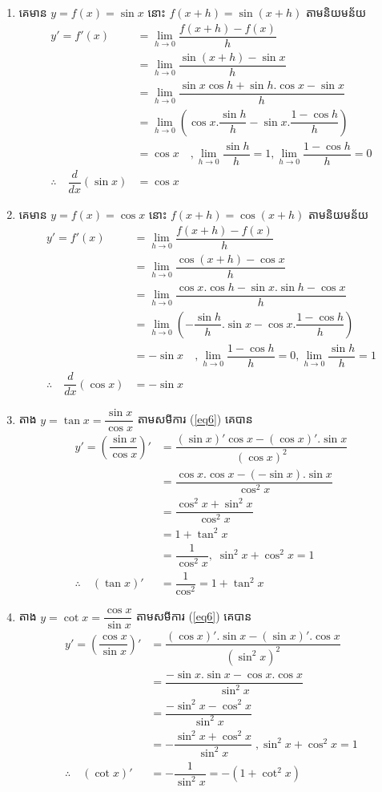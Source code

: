 \documentclass[12pt,fleqn]{book} %
\begin{document}
\begin{enumerate}
\item គេមាន $y=f(x)=\sin x$ នោះ $f(x+h)=\sin (x+h)$ តាមនិយមន័យ 
\begin{align*}
y'=f'(x)&=\lim_{h\to 0}\dfrac{f(x+h)-f(x)}{h}\\
&=\lim_{h\to 0}\dfrac{\sin (x+h)-\sin x}{h}\\
&=\lim_{h\to 0}\dfrac{\sin x\cos h+\sin h.\cos x -\sin x}{h}\\
&=\lim_{h\to 0}\left(\cos x.\dfrac{\sin h}{h}-\sin x.\dfrac{1-\cos h}{h}  \right)\\
&=\cos x \quad , \lim_{h\to 0}\dfrac{\sin h}{h}=1, \lim_{h\to 0}\dfrac{1-\cos h}{h}=0\\
\therefore \quad \dfrac{d}{dx}(\sin x)&=\cos x
\end{align*} 
\item គេមាន $y=f(x)=\cos x$ នោះ $f(x+h)=\cos (x+h)$ តាមនិយមន័យ
\begin{align*}
y'=f'(x)&=\lim_{h\to 0}\dfrac{f(x+h)-f(x)}{h}\\
&=\lim_{h\to 0}\dfrac{\cos (x+h)-\cos x}{h}\\
&=\lim_{h\to 0}\dfrac{\cos x.\cos h-\sin x .\sin h-\cos x}{h}\\
&=\lim_{h\to 0}\left(-\dfrac{\sin h}{h}.\sin x-\cos x. \dfrac{1-\cos h}{h} \right)\\
&=-\sin x \quad , \lim_{h\to 0}\dfrac{1-\cos h}{h}=0,\lim_{h\to 0}\dfrac{\sin h}{h}=1\\
\therefore\quad \dfrac{d}{dx}(\cos x)&=-\sin x
\end{align*}
\item តាង $y=\tan x=\dfrac{\sin x}{\cos x}$ តាមសមីការ (\ref{eq6}) គេបាន 
\begin{align*}
y'=\left(\dfrac{\sin x}{\cos x} \right)'&=\dfrac{(\sin x)'\cos x-(\cos x)'.\sin x}{(\cos x)^2}\\
&=\dfrac{\cos x.\cos x-(-\sin x).\sin x}{\cos^2 x}\\
&=\dfrac{\cos^2 x+\sin^2 x}{\cos^2 x}\\
&=1+\tan^2 x\\
&=\dfrac{1}{\cos^2 x} ,\; \sin^2 x+\cos^2 x=1\\
\therefore \quad (\tan x)'&=\dfrac{1}{\cos^2}=1+\tan^2 x
\end{align*}
\item តាង $y=\cot x=\dfrac{\cos x}{\sin x}$ តាមសមីការ (\ref{eq6}) គេបាន
\begin{align*}
y'=\left(\dfrac{\cos x}{\sin x} \right)'&=\dfrac{(\cos x)'.\sin x-(\sin x)'.\cos x}{(\sin^2x)^2}\\
&=\dfrac{-\sin x. \sin x-\cos x.\cos x}{\sin^2 x}\\
&=\dfrac{-\sin^2 x-\cos^2 x}{\sin^2 x}\\
&=-\dfrac{\sin^2 x+\cos^2 x}{\sin^2 x} \;, \sin^2 x+\cos^2 x=1\\
\therefore \quad (\cot x)'&=-\dfrac{1}{\sin^2 x}=-(1+\cot^2x) 
\end{align*}
\end{enumerate}
\end{document}
